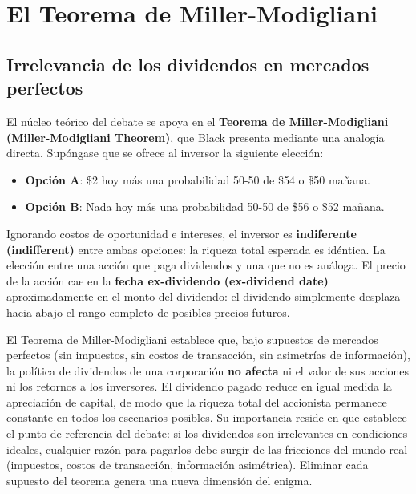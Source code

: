 \documentclass[12pt]{article}
\begin{document}
\section{El Teorema de Miller-Modigliani}

\subsection{Irrelevancia de los dividendos en mercados perfectos}

El n\'ucleo te\'orico del debate se apoya en el \textbf{Teorema de Miller-Modigliani (Miller-Modigliani Theorem)}, que Black presenta mediante una analog\'ia directa. Sup\'ongase que se ofrece al inversor la siguiente elecci\'on:
\begin{itemize}
  \item \textbf{Opci\'on A}: \$2 hoy m\'as una probabilidad 50-50 de \$54 o \$50 ma\~nana.
  \item \textbf{Opci\'on B}: Nada hoy m\'as una probabilidad 50-50 de \$56 o \$52 ma\~nana.
\end{itemize}
Ignorando costos de oportunidad e intereses, el inversor es \textbf{indiferente (indifferent)} entre ambas opciones: la riqueza total esperada es id\'entica. La elecci\'on entre una acci\'on que paga dividendos y una que no es an\'aloga. El precio de la acci\'on cae en la \textbf{fecha ex-dividendo (ex-dividend date)} aproximadamente en el monto del dividendo: el dividendo simplemente desplaza hacia abajo el rango completo de posibles precios futuros.

\begin{explicacion}
El Teorema de Miller-Modigliani establece que, bajo supuestos de mercados perfectos (sin impuestos, sin costos de transacci\'on, sin asimetr\'ias de informaci\'on), la pol\'itica de dividendos de una corporaci\'on \textbf{no afecta} ni el valor de sus acciones ni los retornos a los inversores. El dividendo pagado reduce en igual medida la apreciaci\'on de capital, de modo que la riqueza total del accionista permanece constante en todos los escenarios posibles. Su importancia reside en que establece el punto de referencia del debate: si los dividendos son irrelevantes en condiciones ideales, cualquier raz\'on para pagarlos debe surgir de las fricciones del mundo real (impuestos, costos de transacci\'on, informaci\'on asim\'etrica). Eliminar cada supuesto del teorema genera una nueva dimensi\'on del enigma.
\end{explicacion}
\end{document}

